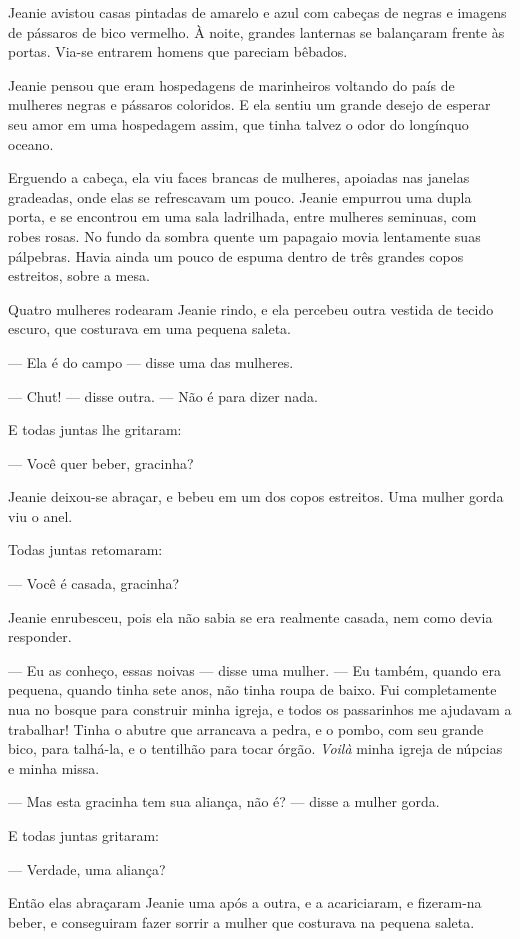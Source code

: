 Jeanie avistou casas pintadas de amarelo e azul com cabeças de negras e
imagens de pássaros de bico vermelho. À noite, grandes lanternas se
balançaram frente às portas. Via-se entrarem homens que pareciam bêbados.

Jeanie pensou que eram hospedagens de marinheiros voltando do país de
mulheres negras e pássaros coloridos. E ela sentiu um grande desejo de
esperar seu amor em uma hospedagem assim, que tinha talvez o odor do
longínquo oceano.

Erguendo a cabeça, ela viu faces brancas de mulheres, apoiadas nas
janelas gradeadas, onde elas se refrescavam um pouco. Jeanie empurrou uma
dupla porta, e se encontrou em uma sala ladrilhada, entre mulheres
seminuas, com robes rosas. No fundo da sombra quente um papagaio movia
lentamente suas pálpebras. Havia ainda um pouco de espuma dentro de três
grandes copos estreitos, sobre a mesa.

Quatro mulheres rodearam Jeanie rindo, e ela percebeu outra vestida de
tecido escuro, que costurava em uma pequena saleta.

--- Ela é do campo --- disse uma das mulheres.

--- Chut! --- disse outra. --- Não é para dizer nada.

E todas juntas lhe gritaram:

--- Você quer beber, gracinha?

Jeanie deixou-se abraçar, e bebeu em um dos copos estreitos. Uma mulher
gorda viu o anel.

Todas juntas retomaram:

--- Você é casada, gracinha?

Jeanie enrubesceu, pois ela não sabia se era realmente casada, nem como
devia responder.

--- Eu as conheço, essas noivas --- disse uma mulher.  --- Eu também, quando era
pequena, quando tinha sete anos, não tinha roupa de baixo. Fui
completamente nua no bosque para construir minha igreja, e todos os
passarinhos me ajudavam a trabalhar! Tinha o abutre que arrancava a pedra,
e o pombo, com seu grande bico, para talhá-la, e o tentilhão para tocar
órgão. \textit{Voilà} minha igreja de núpcias e minha missa.

--- Mas esta gracinha tem sua aliança, não é? --- disse a mulher gorda.

E todas juntas gritaram:

--- Verdade, uma aliança?

Então elas abraçaram Jeanie uma após a outra, e a acariciaram, e
fizeram-na beber, e conseguiram fazer sorrir a mulher que costurava na
pequena saleta.

